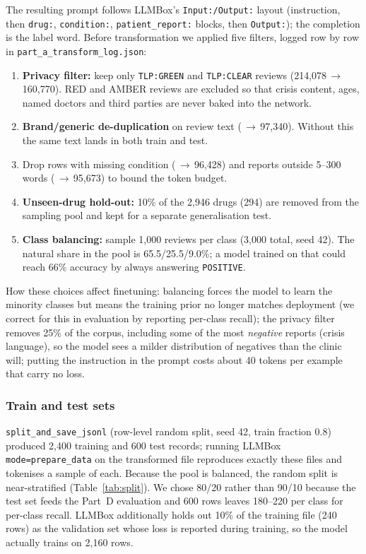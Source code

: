 \documentclass[11pt]{article}
\newcommand{\code}[1]{\texttt{#1}}
\begin{document}
The resulting prompt follows LLMBox's \code{Input:/Output:} layout (instruction, then \code{drug:}, \code{condition:}, \code{patient\_report:} blocks, then \code{Output:}); the completion is the label word. Before transformation we applied five filters, logged row by row in \code{part\_a\_transform\_log.json}:
\begin{enumerate}
\item \textbf{Privacy filter:} keep only \code{TLP:GREEN} and \code{TLP:CLEAR} reviews (214,078\,$\to$\,160,770). RED and AMBER reviews are excluded so that crisis content, ages, named doctors and third parties are never baked into the network.
\item \textbf{Brand/generic de-duplication} on review text (\,$\to$\,97,340). Without this the same text lands in both train and test.
\item Drop rows with missing condition (\,$\to$\,96,428) and reports outside 5--300 words (\,$\to$\,95,673) to bound the token budget.
\item \textbf{Unseen-drug hold-out:} 10\% of the 2,946 drugs (294) are removed from the sampling pool and kept for a separate generalisation test.
\item \textbf{Class balancing:} sample 1,000 reviews per class (3,000 total, seed 42). The natural share in the pool is 65.5/25.5/9.0\%; a model trained on that could reach 66\% accuracy by always answering \code{POSITIVE}.
\end{enumerate}
How these choices affect finetuning: balancing forces the model to learn the minority classes but means the training prior no longer matches deployment (we correct for this in evaluation by reporting per-class recall); the privacy filter removes 25\% of the corpus, including some of the most \emph{negative} reports (crisis language), so the model sees a milder distribution of negatives than the clinic will; putting the instruction in the prompt costs about 40 tokens per example that carry no loss.

\subsubsection{Train and test sets}
\code{split\_and\_save\_jsonl} (row-level random split, seed 42, train fraction 0.8) produced 2,400 training and 600 test records; running LLMBox \code{mode=prepare\_data} on the transformed file reproduces exactly these files and tokenises a sample of each. Because the pool is balanced, the random split is near-stratified (Table~\ref{tab:split}). We chose 80/20 rather than 90/10 because the test set feeds the Part~D evaluation and 600 rows leaves 180--220 per class for per-class recall. LLMBox additionally holds out 10\% of the training file (240 rows) as the validation set whose loss is reported during training, so the model actually trains on 2,160 rows.
\end{document}

